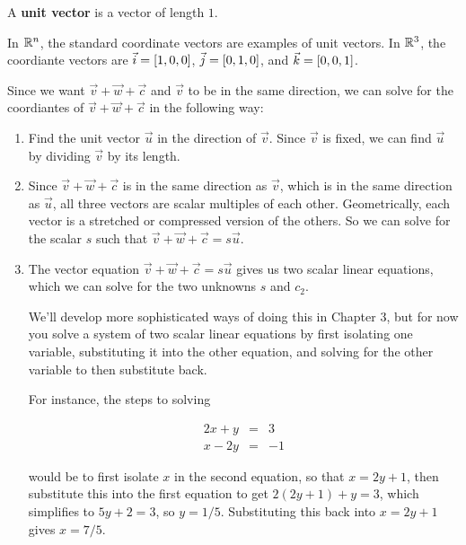 \documentclass{ximera}
\begin{document}
\begin{exploration}
\begin{example}
  \begin{definition}

    A \textbf{unit vector} is a vector of length $1$. 

    In $\mathbb{R}^n$, the standard coordinate vectors are examples of unit vectors. In $\mathbb{R}^3$, the coordiante vectors are $\vec{i}=[1,0,0]$, $\vec{j}=[0,1,0]$, and $\vec{k}=[0,0,1]$.
  \end{definition}

  Since we want $\vec{v}+\vec{w}+\vec{c}$ and $\vec{v}$ to be in the same direction, we can solve for the coordiantes of $\vec{v}+\vec{w}+\vec{c}$ in the following way: 

\begin{enumerate}

\item Find the unit vector $\vec{u}$ in the direction of $\vec{v}$. Since $\vec{v}$ is fixed, we can find $\vec{u}$ by dividing $\vec{v}$ by its length.
\item Since $\vec{v}+\vec{w}+\vec{c}$ is in the same direction as $\vec{v}$, which is in the same direction as $\vec{u}$, all three vectors are scalar multiples of each other. Geometrically, each vector is a stretched or compressed version of the others. So we can solve for the scalar $s$ such that $\vec{v}+\vec{w}+\vec{c}=s\vec{u}$.
\item The vector equation $\vec{v}+\vec{w}+\vec{c}=s\vec{u}$ gives us two scalar linear equations, which we can solve for the two unknowns $s$ and $c_2$.

\begin{hint}

  We'll develop more sophisticated ways of doing this in Chapter 3, but for now you solve a system of two scalar linear equations by first isolating one variable, substituting it into the other equation, and solving for the other variable to then substitute back.

  For instance, the steps to solving 

  \[
  \begin{array}{ccc}
    2x+y&=&3\\
    x-2y&=&-1
  \end{array}
  \]

  would be to first isolate $x$ in the second equation, so that $x=2y+1$, then substitute this into the first equation to get $2(2y+1)+y=3$, which simplifies to $5y+2=3$, so $y=1/5$. Substituting this back into $x=2y+1$ gives $x=7/5$.

\end{hint}


\end{enumerate}
\end{example}
\end{exploration}
\end{document}
